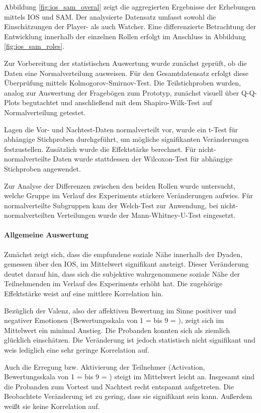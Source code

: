 Abbildung \ref{fig:ios_sam_overal} zeigt die aggregierten Ergebnisse der Erhebungen mittels \ac{IOS} und \ac{SAM}. Der analysierte Datensatz umfasst sowohl die Einschätzungen der Player- als auch Watcher. Eine differenzierte Betrachtung der Entwicklung innerhalb der einzelnen Rollen erfolgt im Anschluss in Abbildung \ref{fig:ios_sam_roles}.

Zur Vorbereitung der statistischen Auswertung wurde zunächst geprüft, ob die Daten eine Normalverteilung ausweisen. Für den Gesamtdatensatz erfolgt diese Überprüfung mittels Kolmogorov-Smirnov-Test. Die Teilstichproben wurden, analog zur Auswertung der Fragebögen zum Prototyp, zunächst visuell über \ac{Q-Q}-Plots begutachtet und anschließend mit dem Shapiro-Wilk-Test auf Normalverteilung getestet.

Lagen die Vor- und Nachtest-Daten normalverteilt vor, wurde ein t-Test für abhängige Stichproben durchgeführt, um mögliche signifikanten Veränderungen festzustellen. Zusätzlich wurde die Effektstärke berechnet. Für nicht-normalverteilte Daten wurde stattdessen der Wilcoxon-Test für abhängige Stichproben angewendet.

Zur Analyse der Differenzen zwischen den beiden Rollen wurde untersucht, welche Gruppe im Verlauf des Experiments stärkere Veränderungen aufwies. Für normalverteilte Subgruppen kam der Welch-Test zur Anwendung, bei nicht-normalverteilten Verteilungen wurde der Mann-Whitney-U-Test eingesetzt.

\paragraph{Allgemeine Auswertung}

Zunächst zeigt sich, dass die empfundene soziale Nähe innerhalb der Dyaden, gemessen über den \ac{IOS}, im Mittelwert signifikant ansteigt. Dieser Veränderung deutet darauf hin, dass sich die subjektive wahrgenommene soziale Nähe der Teilnehmenden im Verlauf des Experiments erhöht hat. Die zugehörige Effektstärke weist auf eine mittlere Korrelation hin.

Bezüglich der Valenz, also der affektiven Bewertung im Sinne positiver und negativer Emotionen (Bewertungsskala von 1 =  bis 9 = ), zeigt sich im Mittelwert ein minimal Anstieg. Die Probanden konnten sich als ziemlich glücklich einschätzen. Die Veränderung ist jedoch statistisch nicht signifikant und weis lediglich eine sehr geringe Korrelation auf.

Auch die Erregung bzw. Aktivierung der Teilnehmer (Activation, Bewertungsskala von 1 =  bis 9 = ) steigt im Mittelwert leicht an. Insgesamt sind die Probanden zum Vortest und Nachtest recht entspannt aufgetreten. Die Beobachtete Veränderung ist zu gering, dass sie signifikant sein kann. Außerdem weißt sie keine Korrelation auf.

